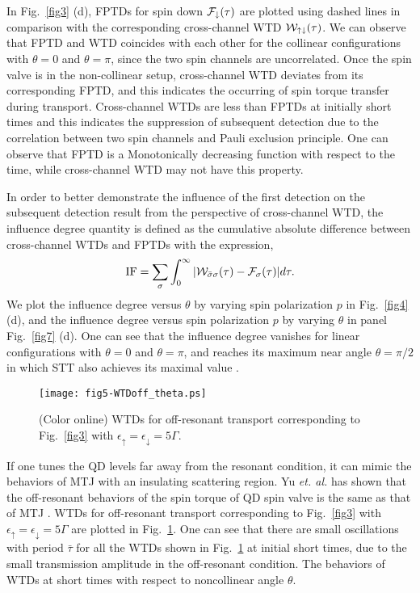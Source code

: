 \documentclass[aps,prb,twocolumn,footinbib,showpacs,superscriptaddress,preprintnumbers,amsmath,amssymb]{revtex4-1}
\begin{document}
	In Fig.~\ref{fig3} (d), FPTDs for spin down ${\cal F}_{\downarrow}(\tau)$ are plotted using dashed lines in comparison with the corresponding cross-channel WTD ${\cal W}_{\uparrow\downarrow}(\tau)$. We can observe that FPTD and WTD coincides with each other for the collinear configurations with $\theta=0$ and $\theta=\pi$, since the two spin channels are uncorrelated. Once the spin valve is in the non-collinear setup, cross-channel WTD deviates from its corresponding FPTD, and this indicates the occurring of spin torque transfer during transport. Cross-channel WTDs are less than FPTDs at initially short times and this indicates the suppression of subsequent detection due to the correlation between two spin channels and Pauli exclusion principle. One can observe that FPTD is a Monotonically decreasing function with respect to the time, while cross-channel WTD may not have this property. 
	
	
	In order to better demonstrate the influence of the first detection on the subsequent detection result from the perspective of cross-channel WTD, the influence degree quantity is defined as the cumulative absolute difference between cross-channel WTDs and FPTDs with the expression,
\begin{equation}
{\rm IF} = \sum_\sigma \int_0^\infty |{\cal W}_{\bar{\sigma}\sigma}(\tau)-{\cal F}_\sigma (\tau)| d\tau .
\end{equation}
We plot the influence degree versus $\theta$ by varying spin polarization $p$ in Fig.~\ref{fig4} (d), and the influence degree versus spin polarization $p$ by varying $\theta$ in panel Fig.~\ref{fig7} (d). One can see that the influence degree vanishes for linear configurations with $\theta =0$ and $\theta=\pi$, and reaches its maximum near angle $\theta =\pi/2$ in which STT also achieves its maximal value \cite{Theodonis1,Theodonis2,Theodonis3}. 	

\begin{figure}
\centering
  \texttt{[image: fig5-WTDoff\_theta.ps]} \\
  \caption{(Color online) WTDs for off-resonant transport corresponding to Fig.~\ref{fig3} with $\epsilon_\uparrow =\epsilon_\downarrow =5\Gamma$. }
  \label{fig5-off}
\end{figure}

If one tunes the QD levels far away from the resonant condition, it can mimic the behaviors of MTJ with an insulating scattering region. Yu {\it et. al.} has shown that the off-resonant behaviors of the spin torque of QD spin valve is the same as that of MTJ \cite{YunjinYu}. WTDs for off-resonant transport corresponding to Fig.~\ref{fig3} with $\epsilon_\uparrow =\epsilon_\downarrow =5\Gamma$ are plotted in Fig.~\ref{fig5-off}. One can see that there are small oscillations with period $\bar{\tau}$ for all the WTDs shown in Fig.~\ref{fig5-off} at initial short times, due to the small transmission amplitude in the off-resonant condition. \cite{WTD2012} The behaviors of WTDs at short times with respect to noncollinear angle $\theta$.
\end{document}
